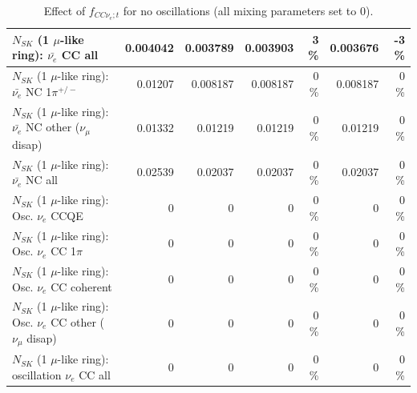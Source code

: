 \begin{table}
\begin{tabular}{| l | r | r | r  r | r  r |}
                            $N_{SK}$ (1 $\mu$-like ring): $\bar{\nu_{e}}$ CC all &        0.004042 &        0.003789 &        0.003903 &        3 \%  &        0.003676 &       -3 \%  \\ 
\hline
                     $N_{SK}$ (1 $\mu$-like ring): $\bar{\nu_e}$ NC 1$\pi^{+/-}$ &         0.01207 &        0.008187 &        0.008187 &        0 \%  &        0.008187 &        0 \%  \\ 
          $N_{SK}$ (1 $\mu$-like ring): $\bar{\nu_e}$ NC other ($\nu_\mu$ disap) &         0.01332 &         0.01219 &         0.01219 &        0 \%  &         0.01219 &        0 \%  \\ 
                            $N_{SK}$ (1 $\mu$-like ring): $\bar{\nu_{e}}$ NC all &         0.02539 &         0.02037 &         0.02037 &        0 \%  &         0.02037 &        0 \%  \\ 
\hline
\hline
\hline
                                 $N_{SK}$ (1 $\mu$-like ring): Osc. $\nu_e$ CCQE &               0 &               0 &               0 &        0 \%  &               0 &        0 \%  \\ 
                            $N_{SK}$ (1 $\mu$-like ring): Osc. $\nu_e$ CC 1$\pi$ &               0 &               0 &               0 &        0 \%  &               0 &        0 \%  \\ 
                          $N_{SK}$ (1 $\mu$-like ring): Osc. $\nu_e$ CC coherent &               0 &               0 &               0 &        0 \%  &               0 &        0 \%  \\ 
           $N_{SK}$ (1 $\mu$-like ring): Osc. $\nu_e$ CC other ($\nu_\mu$ disap) &               0 &               0 &               0 &        0 \%  &               0 &        0 \%  \\ 
                        $N_{SK}$ (1 $\mu$-like ring): oscillation $\nu_e$ CC all &               0 &               0 &               0 &        0 \%  &               0 &        0 \%  \\ 
\hline
\hline
\end{tabular}
\caption{ Effect of $f_{CC\nu_e; t}$ for no oscillations (all mixing parameters set to 0). }
\label{tab:num_xsec_norm_nuetonumu_1RmuT_3f_osc_t13:0}
\end{table}
\clearpage
